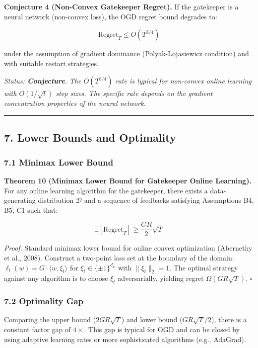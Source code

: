 \documentclass[
  12pt,
]{ctexart}
\begin{document}
\textbf{Conjecture 4 (Non-Convex Gatekeeper Regret).} If the gatekeeper
is a neural network (non-convex loss), the OGD regret bound degrades to:

\[\text{Regret}_T \leq O(T^{3/4})\]

under the assumption of gradient dominance (Polyak-Lojasiewicz
condition) and with suitable restart strategies.

\emph{Status: \textbf{Conjecture}. The \(O(T^{3/4})\) rate is typical
for non-convex online learning with \(O(1/\sqrt{t})\) step sizes. The
specific rate depends on the gradient concentration properties of the
neural network.}

\begin{center}\rule{0.5\linewidth}{0.5pt}\end{center}

\subsection{7. Lower Bounds and
Optimality}\label{lower-bounds-and-optimality}

\subsubsection{7.1 Minimax Lower Bound}\label{minimax-lower-bound}

\textbf{Theorem 10 (Minimax Lower Bound for Gatekeeper Online
Learning).} For any online learning algorithm for the gatekeeper, there
exists a data-generating distribution \(\mathcal{D}\) and a sequence of
feedbacks satisfying Assumptions B4, B5, C1 such that:

\[\mathbb{E}[\text{Regret}_T] \geq \frac{GR}{2} \sqrt{T}\]

\emph{Proof.} Standard minimax lower bound for online convex
optimization (Abernethy et al., 2008). Construct a two-point loss set at
the boundary of the domain:
\(\ell_t(w) = G \cdot \langle w, \xi_t \rangle\) for
\(\xi_t \in \{\pm 1\}^{d_w}\) with \(\|\xi_t\|_2 = 1\). The optimal
strategy against any algorithm is to choose \(\xi_t\) adversarially,
yielding regret \(\Omega(GR\sqrt{T})\). \(\square\)

\subsubsection{7.2 Optimality Gap}\label{optimality-gap}

Comparing the upper bound (\(2GR\sqrt{T}\)) and lower bound
(\(GR\sqrt{T}/2\)), there is a constant factor gap of \(4\times\). This
gap is typical for OGD and can be closed by using adaptive learning
rates or more sophisticated algorithms (e.g., AdaGrad).
\end{document}
